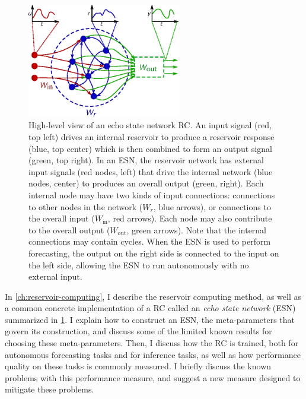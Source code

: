 \begin{figure}
  \includegraphics[width=0.6\textwidth]{figures/reservoir}
  \caption{High-level view of an echo state network RC.  An input
    signal (red, top left) drives an internal reservoir to produce a
    reservoir response (blue, top center) which is then combined to
    form an output signal (green, top right). In an ESN, the reservoir
    network has external input signals (red nodes, left) that drive
    the internal network (blue nodes, center) to produces an overall
    output (green, right).  Each internal node may have two kinds of
    input connections: connections to other nodes in the network
    ($W_r$, blue arrows), or connections to the overall input
    ($W_\text{in}$, red arrows). Each node may also contribute to the
    overall output ($W_\text{out}$, green arrows). Note that the
    internal connections may contain cycles.  When the ESN is used to
    perform forecasting, the output on the right side is connected to
    the input on the left side, allowing the ESN to run autonomously
    with no external input.}%
  \label{fig:intro-reservoir}
\end{figure}

In \cref{ch:reservoir-computing}, I describe the reservoir computing
method, as well as a common concrete implementation of a RC called an
\emph{echo state network} (ESN) summarized in \cref{fig:intro-reservoir}. I
explain how to construct an ESN, the meta-parameters that govern its
construction, and discuss some of the limited known results for
choosing these meta-parameters. Then, I discuss how the RC is trained,
both for autonomous forecasting tasks and for inference tasks, as well
as how performance quality on these tasks is commonly measured. I
briefly discuss the known problems with this performance measure, and
suggest a new measure designed to mitigate these problems.


